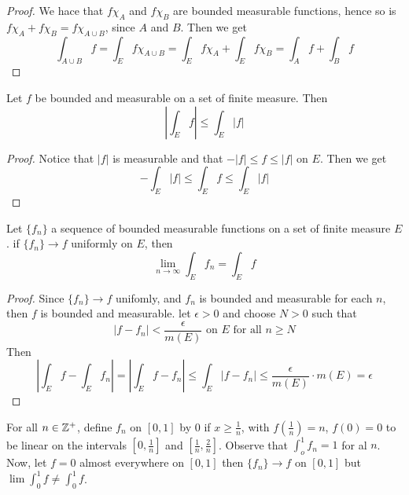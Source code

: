\begin{proof}
    We hace that $f\chi_A$ and  $f\chi_B$ are bounded measurable functions,
    hence so is  $f\chi_A+f\chi_B=f\chi_{A \cup B}$, since $A$ and $B$. Then we
    get
    \begin{equation*}
        \int_{A \cup B}{f}=\int_E{f\chi_{A \cup
        B}}=\int_E{f\chi_A}+\int_E{f\chi_B}=\int_A{f}+\int_B{f}
    \end{equation*}
\end{proof}
\begin{corollary}
    Let $f$ be bounded and measurable on a set of finite measure. Then
    \begin{equation*}
        |\int_E{f}| \leq \int_E{|f|}
    \end{equation*}
\end{corollary}
\begin{proof}
    Notice that $|f|$ is measurable and that  $-|f| \leq f \leq |f|$ on  $E$.
    Then we get
    \begin{equation*}
        -\int_E{|f|} \leq \int_E{f} \leq \int_E{|f|}
    \end{equation*}
\end{proof}

\begin{theorem}\label{10.1.6}
    Let $\{f_n\}$ a sequence of bounded measurable functions on a set of finite
    measure $E$. if  $\{f_n\} \xrightarrow{} f$ uniformly on $E$, then
    \begin{equation*}
        \lim_{n \xrightarrow{} \infty}{\int_E{f_n}}=\int_E{f}
    \end{equation*}
\end{theorem}
\begin{proof}
    Since $\{f_n\} \xrightarrow{} f$ unifomly, and $f_n$ is bounded and
    measurable for each $n$, then  $f$ is bounded and measurable. let
    $\epsilon>0$ and choose $N>0$ such that
    \begin{equation*}
        |f-f_n|<\frac{\epsilon}{m(E)} \text{ on } E \text{ for all } n \geq N
    \end{equation*}
    Then
    \begin{equation*}
        |\int_E{f}-\int_E{f_n}|=|\int_E{f-f_n}| \leq \int_E{|f-f_n|} \leq
        \frac{\epsilon}{m(E)} \cdot m(E)=\epsilon
    \end{equation*}
\end{proof}

\begin{example}\label{10.2}
    For all $n \in \mathbb{Z}^+$, define  $f_n$ on  $[0,1]$ by $0$ if  $x \geq
    \frac{1}{n}$, with $f(\frac{1}{n})=n$, $f(0)=0$ to be linear on the
    intervals $[0,\frac{1}{n}]$ and $[\frac{1}{n}, \frac{2}{n}]$. Observe that
    $\int_o^1{f_n}=1$ for al $n$. Now, let  $f=0$ almost everywhere on  $[0,1]$
    then $\{f_n\} \xrightarrow{} f$ on $[0,1]$ but $\lim{\int_0^1{f}} \neq
    \int_0^1{f}$.
\end{example}

